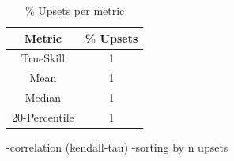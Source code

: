 \begin{table}[H]
\centering
\begin{tabular}{|| c | c ||} 
 \hline
 Metric & \% Upsets \\ [0.5ex] 
 \hline\hline
    TrueSkill & 1 \\
    Mean & 1 \\
    Median & 1 \\
    20-Percentile & 1 \\ [1ex]
 \hline
\end{tabular}
\label{MetricsUpsets}
\caption{\% Upsets per metric}
\end{table}

\begin{code}
    -correlation (kendall-tau)
    -sorting by n upsets
\end{code}

